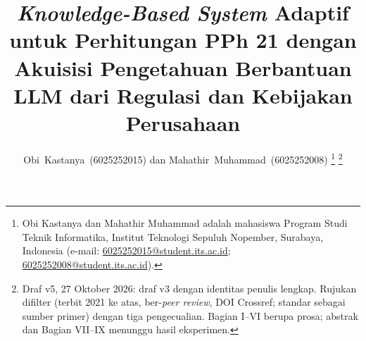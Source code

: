 \documentclass[journal,a4paper]{IEEEtran}
\newcommand{\en}[1]{\textit{#1}}
\begin{document}
\title{\en{Knowledge-Based System} Adaptif untuk Perhitungan PPh 21 dengan Akuisisi Pengetahuan Berbantuan LLM dari Regulasi dan Kebijakan Perusahaan}
\author{Obi~Kastanya~(6025252015) dan Mahathir~Muhammad~(6025252008)%
\thanks{Obi Kastanya dan Mahathir Muhammad adalah mahasiswa Program Studi Teknik Informatika, Institut Teknologi Sepuluh Nopember, Surabaya, Indonesia (e-mail: \url{6025252015@student.its.ac.id}; \url{6025252008@student.its.ac.id}).}%
\thanks{Draf v5, 27 Oktober 2026: draf v3 dengan identitas penulis lengkap. Rujukan difilter (terbit 2021 ke atas, ber-\en{peer review}, DOI Crossref; standar sebagai sumber primer) dengan tiga pengecualian. Bagian I--VI berupa prosa; abstrak dan Bagian VII--IX menunggu hasil eksperimen.}}
\maketitle














\end{document}
